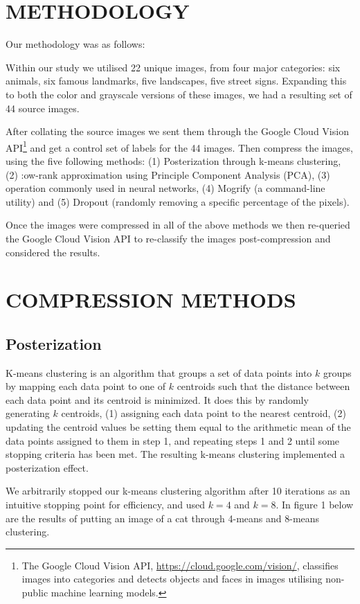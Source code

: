 \documentclass[letterpaper, 12 pt, conference]{ieeeconf}  %
\begin{document}
\section{METHODOLOGY}
Our methodology was as follows:

Within our study we utilised 22 unique images, from four major
categories: six animals, six famous landmarks, five landscapes, five
street signs. Expanding this to both the color and grayscale
versions of these images, we had a resulting set of 44 source images.

After collating the source images we sent them through the Google Cloud Vision API\footnote{The Google Cloud Vision API, \url{https://cloud.google.com/vision/}, classifies images into categories and detects objects and faces in images utilising non-public machine learning models.}
and get a control set of labels for the 44 images. Then compress the images, using the five following methods:
(1) Posterization through k-means clustering,
(2) :ow-rank approximation using Principle Component Analysis (PCA),
(3)  operation commonly used in neural networks,
(4) Mogrify (a command-line utility)
and (5) Dropout (randomly removing a specific percentage of the pixels).

Once the images were compressed in all of the above methods we then re-queried the Google Cloud Vision API to re-classify the images post-compression and considered the results.

\section{COMPRESSION METHODS}
\subsection{Posterization}
K-means clustering is an algorithm that groups
a set of data points into $k$ groups by mapping each data point
to one of $k$ centroids such that the distance between each data point
and its centroid is minimized. It does this by randomly generating $k$
centroids, (1) assigning each data point to the nearest centroid,
(2) updating the centroid values be setting them equal to the arithmetic
mean of the data points assigned to them in step 1, and repeating steps
1 and 2 until some stopping criteria has been met. The resulting k-means clustering implemented a posterization
effect.

We arbitrarily stopped our k-means clustering algorithm after 10 iterations as an intuitive stopping point for efficiency, and used $k=4$ and $k=8$. In figure 1 below are the results of putting an image of a cat through 4-means and 8-means clustering.
\end{document}
